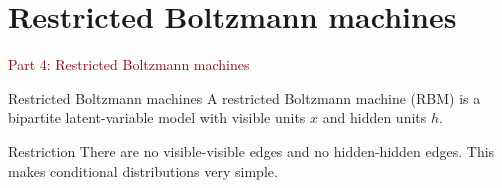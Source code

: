 \documentclass[dvipsnames,aspectratio=169,handout]{beamer}
\begin{document}

\section{Restricted Boltzmann machines}

\begin{frame}{}
\begin{center}
{\Huge \textcolor{DarkRed}{Part 4: Restricted Boltzmann machines}}
\end{center}
\end{frame}

\begin{frame}{Restricted Boltzmann machines}
A restricted Boltzmann machine (RBM) is a bipartite latent-variable model with visible units $x$ and hidden units $h$.

\begin{center}
\end{center}

\begin{alertblock}{Restriction}
There are no visible-visible edges and no hidden-hidden edges.
This makes conditional distributions very simple.
\end{alertblock}
\end{frame}
\end{document}
